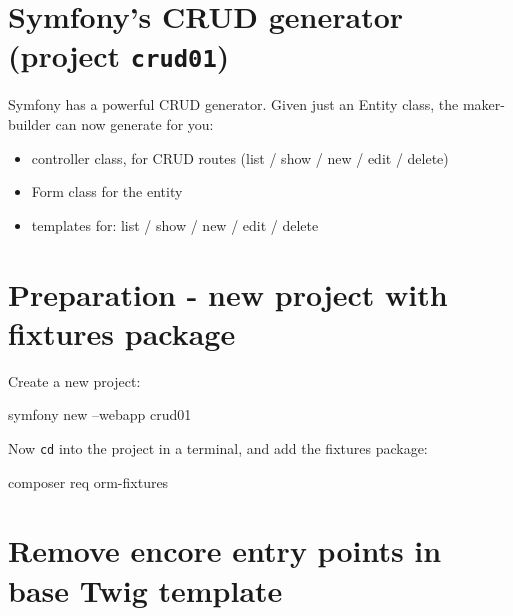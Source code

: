 \documentclass[a4paperpaper,openright]{book}
\newenvironment{Shaded}{}{}
\newcommand{\ExtensionTok}[1]{#1}
\newcommand{\NormalTok}[1]{#1}
\begin{document}
\hypertarget{symfonys-crud-generator-project-crud01}{%
\section{\texorpdfstring{Symfony's CRUD generator (project
\texttt{crud01})}{Symfony's CRUD generator (project crud01)}}\label{symfonys-crud-generator-project-crud01}}

Symfony has a powerful CRUD generator. Given just an Entity class, the
maker-builder can now generate for you:

\begin{itemize}
\item
  controller class, for CRUD routes (list / show / new / edit / delete)
\item
  Form class for the entity
\item
  templates for: list / show / new / edit / delete
\end{itemize}

\hypertarget{preparation---new-project-with-fixtures-package}{%
\section{Preparation - new project with fixtures
package}\label{preparation---new-project-with-fixtures-package}}

Create a new project:

\begin{Shaded}
\begin{Highlighting}[]
     \ExtensionTok{symfony}\NormalTok{ new --webapp crud01}
\end{Highlighting}
\end{Shaded}

Now \texttt{cd} into the project in a terminal, and add the fixtures
package:

\begin{Shaded}
\begin{Highlighting}[]
     \ExtensionTok{composer}\NormalTok{ req orm-fixtures}
\end{Highlighting}
\end{Shaded}

\hypertarget{remove-encore-entry-points-in-base-twig-template}{%
\section{Remove encore entry points in base Twig
template}\label{remove-encore-entry-points-in-base-twig-template}}
\end{document}
